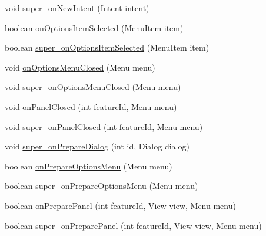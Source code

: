 \begin{DoxyCompactItemize}
\item 
void \hyperlink{classorg_1_1qtproject_1_1qt5_1_1android_1_1bindings_1_1_qt_activity_afb8a02b6c2e3c8e868f8cce113f50b18}{super\-\_\-on\-New\-Intent} (Intent intent)
\item 
boolean \hyperlink{classorg_1_1qtproject_1_1qt5_1_1android_1_1bindings_1_1_qt_activity_a1062f0dfba41ba945835041b94bfe4fa}{on\-Options\-Item\-Selected} (Menu\-Item item)
\item 
boolean \hyperlink{classorg_1_1qtproject_1_1qt5_1_1android_1_1bindings_1_1_qt_activity_aab1ebb0d4fe4429af0b9e79a4a6295ad}{super\-\_\-on\-Options\-Item\-Selected} (Menu\-Item item)
\item 
void \hyperlink{classorg_1_1qtproject_1_1qt5_1_1android_1_1bindings_1_1_qt_activity_aad115f4cdaebb71916b85ac6309a83c4}{on\-Options\-Menu\-Closed} (Menu menu)
\item 
void \hyperlink{classorg_1_1qtproject_1_1qt5_1_1android_1_1bindings_1_1_qt_activity_abd8ef4d5f57f3046c3065cbe806f690b}{super\-\_\-on\-Options\-Menu\-Closed} (Menu menu)
\item 
void \hyperlink{classorg_1_1qtproject_1_1qt5_1_1android_1_1bindings_1_1_qt_activity_a2b39eac5b8b7003b20171ddce6b16e37}{on\-Panel\-Closed} (int feature\-Id, Menu menu)
\item 
void \hyperlink{classorg_1_1qtproject_1_1qt5_1_1android_1_1bindings_1_1_qt_activity_a5f9ad8da2fcebff92ef8c86583091d75}{super\-\_\-on\-Panel\-Closed} (int feature\-Id, Menu menu)
\item 
void \hyperlink{classorg_1_1qtproject_1_1qt5_1_1android_1_1bindings_1_1_qt_activity_aacc652635f4bf45e2fa182dc44e8df13}{super\-\_\-on\-Prepare\-Dialog} (int id, Dialog dialog)
\item 
boolean \hyperlink{classorg_1_1qtproject_1_1qt5_1_1android_1_1bindings_1_1_qt_activity_a71a7e747de798c51b6a385b5e8a99c61}{on\-Prepare\-Options\-Menu} (Menu menu)
\item 
boolean \hyperlink{classorg_1_1qtproject_1_1qt5_1_1android_1_1bindings_1_1_qt_activity_a9f7f63be6b9a75253b784e80bfa74f69}{super\-\_\-on\-Prepare\-Options\-Menu} (Menu menu)
\item 
boolean \hyperlink{classorg_1_1qtproject_1_1qt5_1_1android_1_1bindings_1_1_qt_activity_a668c15554849a0bce9422eb709b5cacc}{on\-Prepare\-Panel} (int feature\-Id, View view, Menu menu)
\item 
boolean \hyperlink{classorg_1_1qtproject_1_1qt5_1_1android_1_1bindings_1_1_qt_activity_ab8af6f3b5a5b4547829dc68e7c31fd86}{super\-\_\-on\-Prepare\-Panel} (int feature\-Id, View view, Menu menu)

\end{DoxyCompactItemize}
